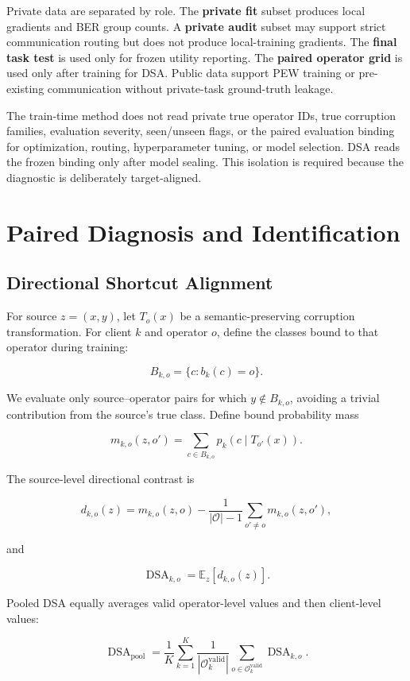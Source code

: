 Private data are separated by role. The \textbf{private fit} subset produces local gradients and BER group counts. A \textbf{private audit} subset may support strict communication routing but does not produce local-training gradients. The \textbf{final task test} is used only for frozen utility reporting. The \textbf{paired operator grid} is used only after training for DSA. Public data support PEW training or pre-existing communication without private-task ground-truth leakage.

The train-time method does not read private true operator IDs, true corruption families, evaluation severity, seen/unseen flags, or the paired evaluation binding for optimization, routing, hyperparameter tuning, or model selection. DSA reads the frozen binding only after model sealing. This isolation is required because the diagnostic is deliberately target-aligned.

\section{Paired Diagnosis and Identification}

\subsection{Directional Shortcut Alignment}

For source \(z=(x,y)\), let \(T_o(x)\) be a semantic-preserving corruption transformation. For client \(k\) and operator \(o\), define the classes bound to that operator during training:

\[
B_{k,o}=\{c:b_k(c)=o\}.
\]

We evaluate only source--operator pairs for which \(y\notin B_{k,o}\), avoiding a trivial contribution from the source's true class. Define bound probability mass

\[
m_{k,o}(z,o')=\sum_{c\in B_{k,o}}p_k(c\mid T_{o'}(x)).
\]

The source-level directional contrast is

\[
d_{k,o}(z)=m_{k,o}(z,o)
-\frac{1}{|\mathcal O|-1}\sum_{o'\neq o}m_{k,o}(z,o'),
\]

and

\[
\operatorname{DSA}_{k,o}=\mathbb E_z[d_{k,o}(z)].
\]

Pooled DSA equally averages valid operator-level values and then client-level values:

\[
\operatorname{DSA}_{\mathrm{pool}}
=\frac1K\sum_{k=1}^{K}
\frac1{|\mathcal O_k^{\mathrm{valid}}|}
\sum_{o\in\mathcal O_k^{\mathrm{valid}}}\operatorname{DSA}_{k,o}.
\]

